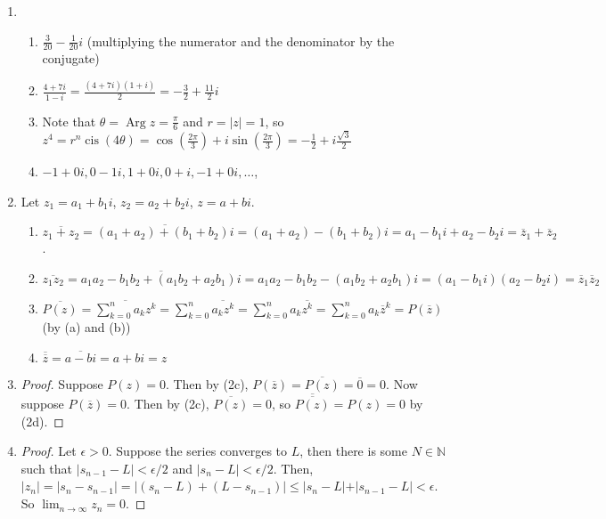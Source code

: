 \documentclass[11pt, letterpaper]{article}
\begin{document}
\thispagestyle{firststyle}


\begin{enumerate}
  \item \begin{enumerate}
    \item $\frac{3}{20} - \frac{1}{20}i$ (multiplying the numerator and the denominator by the conjugate)
    \item $\frac{4 + 7i}{1 - i} = \frac{(4 + 7i)(1 + i)}{2} = -\frac{3}{2} + \frac{11}{2}i$
    \item Note that $\theta = \operatorname{Arg} z = \frac{\pi}{6}$ and $r = \vert z \vert = 1$, so $z^4 = r^n\operatorname{cis}(4 \theta) = \cos(\frac{2\pi}{3}) + i\sin(\frac{2\pi}{3}) = -\frac{1}{2} + i \frac{\sqrt 3}{2}$ 
    \item $-1 + 0i, 0 - 1i, 1 + 0i, 0 + i, -1 + 0i, \dots$,  
  \end{enumerate}

  \item Let $z_1 = a_1 + b_1i$, $z_2 = a_2 + b_2i$, $z = a + bi$.
  \begin{enumerate}
    \item $\overline{z_1 + z_2} = \overline{(a_1 + a_2) + (b_1 + b_2)i} = (a_1 + a_2) - (b_1 + b_2)i = a_1 - b_1i + a_2 - b_2i = \overline z_1 + \overline z_2$.
    \item $\overline{z_1z_2} = \overline{a_1a_2 - b_1b_2 + (a_1b_2 + a_2b_1)i} = a_1a_2 - b_1b_2 - (a_1b_2 + a_2b_1)i = (a_1 - b_1i)(a_2 - b_2i) = \overline z_1 \overline z_2$
    \item $\overline{P(z)} = \overline{\sum_{k = 0}^n a_k z^k} = \sum_{k = 0}^n \overline{a_k z^k} = \sum_{k = 0}^n a_k \overline{z^k} = \sum_{k = 0}^n a_k \overline z^k = P(\overline z)$ (by (a) and (b))
    \item $\overline{\overline z} = \overline{a - bi} = a + bi = z$
  \end{enumerate}

  \item \begin{proof}
    Suppose $P(z) = 0$. Then by (2c), $P(\overline z) = \overline{P(z)} = \overline 0 = 0.$ Now suppose $P(\overline z) = 0$. Then by (2c), $\overline{P(z)} = 0$, so $\overline{\overline{P(z)}} = P(z) = 0$ by (2d).
  \end{proof}

  \item \begin{proof}
    Let $\epsilon > 0$. Suppose the series converges to $L$, then there is some $N \in \mathbb N$ such that $\vert s_{n - 1} - L \vert < \epsilon/2$ and $\vert s_n - L \vert < \epsilon/2$. Then, $\vert z_n \vert = \vert s_n - s_{n - 1} \vert = \vert (s_n - L) + (L - s_{n - 1}) \vert \leq \vert s_n - L \vert + \vert s_{n - 1} - L \vert < \epsilon$. So $\lim_{n \to \infty} z_n = 0$.
  \end{proof}


\end{enumerate}
\end{document}
